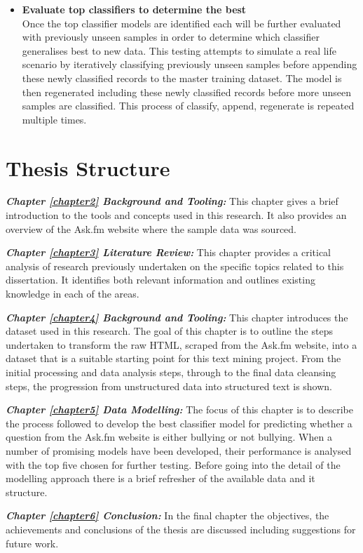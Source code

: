 \begin{itemize}
	\item \textbf{Evaluate top classifiers to determine the best} \\
	Once the top classifier models are identified each will be further evaluated with previously unseen samples in order to determine which classifier generalises best to new data. This testing attempts to simulate a real life scenario by iteratively classifying previously unseen samples before appending these newly classified records to the master training dataset. The model is then regenerated including these newly classified records before more unseen samples are classified. This process of classify, append, regenerate is repeated multiple times. 

\end{itemize}
  

\section{Thesis Structure}

\textbf{\textit{Chapter \ref{chapter2} Background and Tooling:}} This chapter gives a brief introduction to the tools and concepts used in this research. It also provides an overview of the Ask.fm website where the sample data was sourced.

\textbf{\textit{Chapter \ref{chapter3} Literature Review:}} This chapter provides a critical analysis of research previously undertaken on the specific topics related to this dissertation. It identifies both relevant information and outlines existing knowledge in each of the areas.

\textbf{\textit{Chapter \ref{chapter4} Background and Tooling:}} This chapter introduces the dataset used in this research. The goal of this chapter is to outline the steps undertaken to transform the raw HTML, scraped from the Ask.fm website, into a dataset that is a suitable starting point for this text mining project. From the initial processing and data analysis steps, through to the final data cleansing steps, the progression from unstructured data into structured text is shown.

\textbf{\textit{Chapter \ref{chapter5} Data Modelling:}} The focus of this chapter is to describe the process followed to develop the best classifier model for predicting whether a question from the Ask.fm website is either bullying or not bullying. When a number of promising models have been developed, their performance is analysed with the top five chosen for further testing. Before going into the detail of the modelling approach there is a brief refresher of the available data and it structure.

\textbf{\textit{Chapter \ref{chapter6} Conclusion:}} In the final chapter the objectives, the achievements and conclusions of the thesis are discussed including suggestions for future work.








